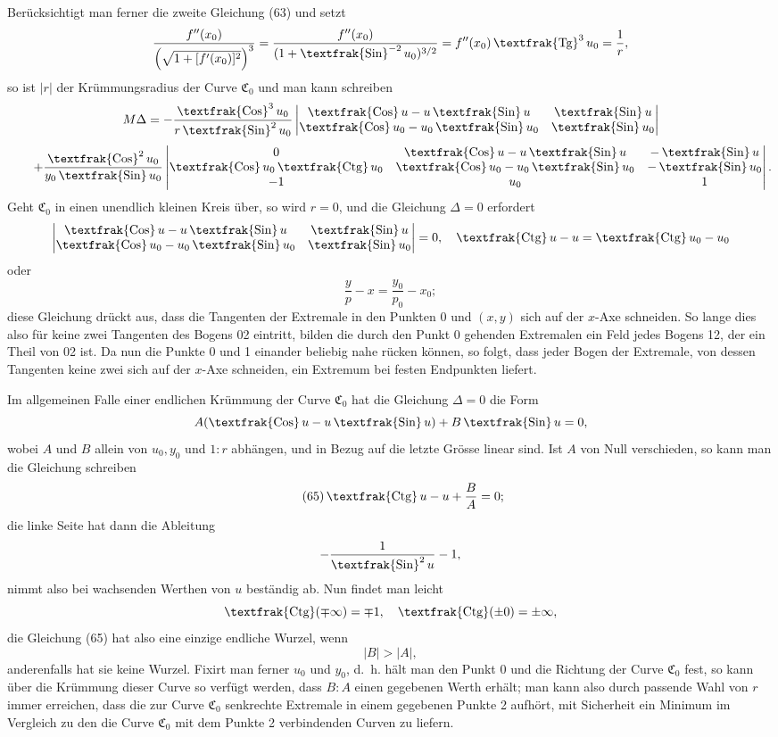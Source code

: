 \documentclass[11pt,a4paper,leqno]{article}
\newcommand{\Cof}{\mathop{\text{\textfrak{Cos}}}\nolimits}
\newcommand{\Sin}{\mathop{\text{\textfrak{Sin}}}\nolimits}
\newcommand{\Tg}{\mathop{\text{\textfrak{Tg}}}\nolimits}
\newcommand{\Ctg}{\mathop{\text{\textfrak{Ctg}}}\nolimits}
\begin{document}
Berücksichtigt man ferner die zweite Gleichung (63) und setzt
\[
\frac{f''(x_0)}{\left(\sqrt{1+[f'(x_0)]^2}\right)^3}
=
\frac{f''(x_0)}{(1+\Sin^{-2}u_0)^{3/2}}
=
f''(x_0)\Tg^3u_0
=
\frac{1}{r},
\]
so ist $|r|$ der Krümmungsradius der Curve $\mathfrak{C}_0$ und man kann schreiben
\[
M\Delta
=
-\frac{\Cof^3u_0}{r\Sin^2u_0}
\begin{vmatrix}
\Cof u-u\Sin u & \Sin u\\
\Cof u_0-u_0\Sin u_0 & \Sin u_0
\end{vmatrix}
\]
\[
\qquad
+\frac{\Cof^2u_0}{y_0\Sin u_0}
\begin{vmatrix}
0 & \Cof u-u\Sin u & -\Sin u\\
\Cof u_0\Ctg u_0 & \Cof u_0-u_0\Sin u_0 & -\Sin u_0\\
-1 & u_0 & 1
\end{vmatrix}.
\]
Geht $\mathfrak{C}_0$ in einen unendlich kleinen Kreis über, so wird $r=0$, und die Gleichung $\Delta=0$ erfordert
\[
\begin{vmatrix}
\Cof u-u\Sin u & \Sin u\\
\Cof u_0-u_0\Sin u_0 & \Sin u_0
\end{vmatrix}
=0,\quad
\Ctg u-u=\Ctg u_0-u_0
\]
oder
\[
\frac{y}{p}-x=\frac{y_0}{p_0}-x_0;
\]
diese Gleichung drückt aus, dass die Tangenten der Extremale in den Punkten 0 und $(x,y)$ sich auf der $x$-Axe schneiden. So lange dies also für keine zwei Tangenten des Bogens 02 eintritt, bilden die durch den Punkt 0 gehenden Extremalen ein Feld jedes Bogens 12, der ein Theil von 02 ist. Da nun die Punkte 0 und 1 einander beliebig nahe rücken können, so folgt, dass jeder Bogen der Extremale, von dessen Tangenten keine zwei sich auf der $x$-Axe schneiden, ein Extremum bei festen Endpunkten liefert.

Im allgemeinen Falle einer endlichen Krümmung der Curve $\mathfrak{C}_0$ hat die Gleichung $\Delta=0$ die Form
\[
A(\Cof u-u\Sin u)+B\Sin u=0,
\]
wobei $A$ und $B$ allein von $u_0,y_0$ und $1:r$ abhängen, und in Bezug auf die letzte Grösse linear sind. Ist $A$ von Null verschieden, so kann man die Gleichung schreiben
\begin{equation}\tag{65}
\Ctg u-u+\frac{B}{A}=0;
\end{equation}
die linke Seite hat dann die Ableitung
\[
-\frac{1}{\Sin^2u}-1,
\]
nimmt also bei wachsenden Werthen von $u$ beständig ab. Nun findet man leicht
\[
\Ctg(\mp\infty)=\mp1,\quad \Ctg(\pm0)=\pm\infty,
\]
die Gleichung (65) hat also eine einzige endliche Wurzel, wenn
\[
|B|>|A|,
\]
anderenfalls hat sie keine Wurzel. Fixirt man ferner $u_0$ und $y_0$, d.~h. hält man den Punkt 0 und die Richtung der Curve $\mathfrak{C}_0$ fest, so kann über die Krümmung dieser Curve so verfügt werden, dass $B:A$ einen gegebenen Werth erhält; man kann also durch passende Wahl von $r$ immer erreichen, dass die zur Curve $\mathfrak{C}_0$ senkrechte Extremale in einem gegebenen Punkte 2 aufhört, mit Sicherheit ein Minimum im Vergleich zu den die Curve $\mathfrak{C}_0$ mit dem Punkte 2 verbindenden Curven zu liefern.
\end{document}
